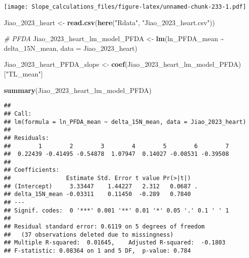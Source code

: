 \documentclass[
]{article}
\newenvironment{Shaded}{\begin{snugshade}}{\end{snugshade}}
\newcommand{\AttributeTok}[1]{\textcolor[rgb]{0.13,0.29,0.53}{#1}}
\newcommand{\CommentTok}[1]{\textcolor[rgb]{0.56,0.35,0.01}{\textit{#1}}}
\newcommand{\FunctionTok}[1]{\textcolor[rgb]{0.13,0.29,0.53}{\textbf{#1}}}
\newcommand{\NormalTok}[1]{#1}
\newcommand{\OtherTok}[1]{\textcolor[rgb]{0.56,0.35,0.01}{#1}}
\newcommand{\SpecialCharTok}[1]{\textcolor[rgb]{0.81,0.36,0.00}{\textbf{#1}}}
\newcommand{\StringTok}[1]{\textcolor[rgb]{0.31,0.60,0.02}{#1}}
\begin{document}
\texttt{[image: Slope\_calculations\_files/figure-latex/unnamed-chunk-233-1.pdf]}

\begin{Shaded}
\begin{Highlighting}[]
\NormalTok{Jiao\_2023\_heart }\OtherTok{\textless{}{-}} \FunctionTok{read.csv}\NormalTok{(}\FunctionTok{here}\NormalTok{(}\StringTok{"Rdata"}\NormalTok{, }\StringTok{"Jiao\_2023\_heart.csv"}\NormalTok{))}

\CommentTok{\# PFDA}
\NormalTok{Jiao\_2023\_heart\_lm\_model\_PFDA }\OtherTok{\textless{}{-}} \FunctionTok{lm}\NormalTok{(ln\_PFDA\_mean }\SpecialCharTok{\textasciitilde{}}\NormalTok{ delta\_15N\_mean,}
                                    \AttributeTok{data =}\NormalTok{ Jiao\_2023\_heart)}

\NormalTok{Jiao\_2023\_heart\_PFDA\_slope }\OtherTok{\textless{}{-}} \FunctionTok{coef}\NormalTok{(Jiao\_2023\_heart\_lm\_model\_PFDA)[}\StringTok{"TL\_mean"}\NormalTok{]}

\FunctionTok{summary}\NormalTok{(Jiao\_2023\_heart\_lm\_model\_PFDA)}
\end{Highlighting}
\end{Shaded}

\begin{verbatim}
## 
## Call:
## lm(formula = ln_PFDA_mean ~ delta_15N_mean, data = Jiao_2023_heart)
## 
## Residuals:
##        1        2        3        4        5        6        7 
##  0.22439 -0.41495 -0.54878  1.07947  0.14027 -0.08531 -0.39508 
## 
## Coefficients:
##                Estimate Std. Error t value Pr(>|t|)  
## (Intercept)     3.33447    1.44227   2.312   0.0687 .
## delta_15N_mean -0.03311    0.11450  -0.289   0.7840  
## ---
## Signif. codes:  0 '***' 0.001 '**' 0.01 '*' 0.05 '.' 0.1 ' ' 1
## 
## Residual standard error: 0.6119 on 5 degrees of freedom
##   (37 observations deleted due to missingness)
## Multiple R-squared:  0.01645,    Adjusted R-squared:  -0.1803 
## F-statistic: 0.08364 on 1 and 5 DF,  p-value: 0.784
\end{verbatim}
\end{document}
